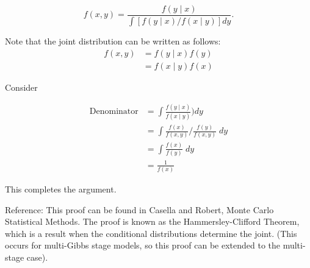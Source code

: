 \documentclass{article}
\begin{document}
\begin{enumerate}
$$f(x,y) = 
\frac{f(y \mid x)}
{\int [ f(y\mid x)/f(x \mid y) ]dy}.$$





Note that the joint distribution can be written as follows:
\begin{align}
f(x,y) &= f(y \mid x)f(y)  \\
&= f(x \mid y)f(x) 
\end{align}

Consider 

\begin{align}
\text{Denominator} &=
\int \frac{f(y\mid x)}{f(x \mid y)}) dy\\
&=\int \frac{f(x)}{f(x,y)} /
 \frac{f(y)}{f(x,y)} \; dy\\
 & = \int \frac{f(x)}{f(y)} \; dy\\
 &= \frac{1}{f(x)}
\end{align}

This completes the argument.

%
%
%

Reference: This proof can be found in Casella and Robert, Monte Carlo Statistical Methods. The proof is known as the Hammersley-Clifford Theorem, which is a result when the  conditional distributions determine the joint. (This occurs for multi-Gibbs stage models, so this proof can be extended to the multi-stage case).


\end{enumerate}
\end{document}
